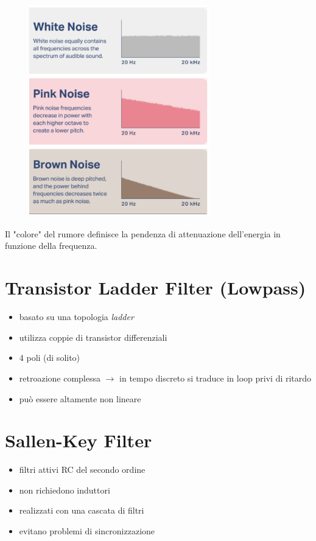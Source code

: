 \begin{figure}[H]
    \centering
    \includegraphics[width=0.7\textwidth]{capitoli/capitolo12/immagini/image2.png}
\end{figure}

Il "colore" del rumore definisce la pendenza di attenuazione dell’energia in funzione della frequenza.

\section{Transistor Ladder Filter (Lowpass)}

\begin{itemize}
    \item basato su una topologia \textit{ladder}
    \item utilizza coppie di transistor differenziali
    \item 4 poli (di solito)
    \item retroazione complessa $\rightarrow$ in tempo discreto si traduce in loop privi di ritardo
    \item può essere altamente non lineare
\end{itemize}
\vspace{8cm}
\section{Sallen-Key Filter}

\begin{itemize}
    \item filtri attivi RC del secondo ordine
    \item non richiedono induttori
    \item realizzati con una cascata di filtri
    \item evitano problemi di sincronizzazione
\end{itemize}


